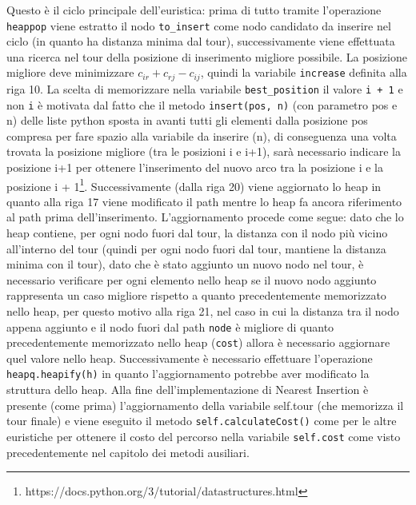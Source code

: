 \documentclass[a4paper,12pt]{report}
\begin{document}
Questo è il ciclo principale dell'euristica: prima di tutto tramite l'operazione \lstinline!heappop! viene estratto il nodo \lstinline!to_insert! come nodo candidato da inserire nel ciclo (in quanto ha distanza minima dal tour), successivamente viene effettuata una ricerca nel tour della posizione di inserimento migliore possibile. La posizione migliore deve minimizzare $c_{ir} + c_{rj} - c_{ij}$, quindi la variabile \lstinline!increase! definita alla riga 10. La scelta di memorizzare nella variabile \lstinline!best_position! il valore \lstinline!i + 1! e non \lstinline!i! è motivata dal fatto che il metodo \lstinline!insert(pos, n)! (con parametro pos e n) delle liste python sposta in avanti tutti gli elementi dalla posizione pos compresa per fare spazio alla variabile da inserire (n), di conseguenza una volta trovata la posizione migliore (tra le posizioni i e i+1), sarà necessario indicare la posizione i+1 per ottenere l'inserimento del nuovo arco tra la posizione i e la posizione i + 1\footnote{https://docs.python.org/3/tutorial/datastructures.html}. \newline Successivamente (dalla riga 20) viene aggiornato lo heap in quanto alla riga 17 viene modificato il path mentre lo heap fa ancora riferimento al path prima dell'inserimento. L'aggiornamento procede come segue: dato che lo heap contiene, per ogni nodo fuori dal tour, la distanza con il nodo più vicino all'interno del tour (quindi per ogni nodo fuori dal tour, mantiene la distanza minima con il tour), dato che è stato aggiunto un nuovo nodo nel tour, è necessario verificare per ogni elemento nello heap se il nuovo nodo aggiunto rappresenta un caso migliore rispetto a quanto precedentemente memorizzato nello heap, per questo motivo alla riga 21, nel caso in cui la distanza tra il nodo appena aggiunto e il nodo fuori dal path \lstinline!node! è migliore di quanto precedentemente memorizzato nello heap (\lstinline!cost!) allora è necessario aggiornare quel valore nello heap. \newline Successivamente è necessario effettuare l'operazione \lstinline!heapq.heapify(h)! in quanto l'aggiornamento potrebbe aver modificato la struttura dello heap. Alla fine dell'implementazione di Nearest Insertion è presente (come prima) l'aggiornamento della variabile self.tour (che memorizza il tour finale) e viene eseguito il metodo \lstinline!self.calculateCost()! come per le altre euristiche per ottenere il costo del percorso nella variabile  \lstinline!self.cost! come visto precedentemente nel capitolo dei metodi ausiliari.
\end{document}
